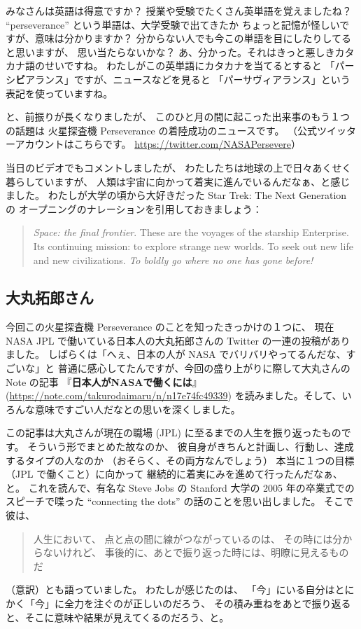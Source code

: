 \documentclass[dvipdfmx,autodetect-engine,10pt,b5paper,papersize,openany,dvipsnames]{jsbook}
\begin{document}
\begin{multicols}{2}
みなさんは英語は得意ですか？
授業や受験でたくさん英単語を覚えましたね？
``perseverance'' という単語は、大学受験で出てきたか
ちょっと記憶が怪しいですが、意味は分かりますか？
分からない人でも今この単語を目にしたりしてると思いますが、
思い当たらないかな？
あ、分かった。それはきっと悪しきカタカナ語のせいですね。
わたしがこの英単語にカタカナを当てるとすると
「パーシ{\bfseries ビ}アランス」ですが、ニュースなどを見ると
「パーサヴィアランス」という表記を使っていますね。

と、前振りが長くなりましたが、
このひと月の間に起こった出来事のもう１つの話題は
火星探査機 Perseverance の着陸成功のニュースです。
（公式ツイッターアカウントはこちらです。
\url{https://twitter.com/NASAPersevere}）

当日のビデオでもコメントしましたが、
わたしたちは地球の上で日々あくせく暮らしていますが、
人類は宇宙に向かって着実に進んでいるんだなぁ、と感じました。
わたしが大学の頃から大好きだった Star Trek: The Next Generation の
オープニングのナレーションを引用しておきましょう：
\begin{quotation}
  \noindent
  {\it Space: the final frontier}.
  These are the voyages of the starship Enterprise.
  Its continuing mission: to explore strange new worlds.
  To seek out new life and new civilizations.
  {\it To boldly go where no one has gone before!}
\end{quotation}


\subsection{大丸拓郎さん}
今回この火星探査機 Perseverance のことを知ったきっかけの１つに、
現在 NASA JPL で働いている日本人の大丸拓郎さんの Twitter の一連の投稿がありました。
しばらくは「へぇ、日本の人が NASA でバリバリやってるんだな、すごいな」と
普通に感心してたんですが、今回の盛り上がりに際して大丸さんの Note の記事
『{\gtfamily\bfseries 日本人がNASAで働くには}』
(\url{https://note.com/takurodaimaru/n/n17e74fc49339})
を読みました。そして、いろんな意味ですごい人だなとの思いを深くしました。


この記事は大丸さんが現在の職場 (JPL) に至るまでの人生を振り返ったものです。
そういう形でまとめた故なのか、
彼自身がきちんと計画し、行動し、達成するタイプの人なのか
（おそらく、その両方なんでしょう）
本当に１つの目標（JPL で働くこと）に向かって
継続的に着実にみを進めて行ったんだなぁ、と。
これを読んで、有名な Steve Jobs の Stanford 大学の
2005 年の卒業式でのスピーチで喋った
``connecting the dots'' の話のことを思い出しました。
そこで彼は、
\begin{quotation}
  \noindent
  人生において、
  点と点の間に線がつながっているのは、
  その時には分からないけれど、
  事後的に、あとで振り返った時には、明瞭に見えるものだ
\end{quotation}
（意訳）とも語っていました。
わたしが感じたのは、
「今」にいる自分はとにかく「今」に全力を注ぐのが正しいのだろう、
その積み重ねをあとで振り返ると、そこに意味や結果が見えてくるのだろう、と。
    


\end{multicols}
\end{document}
